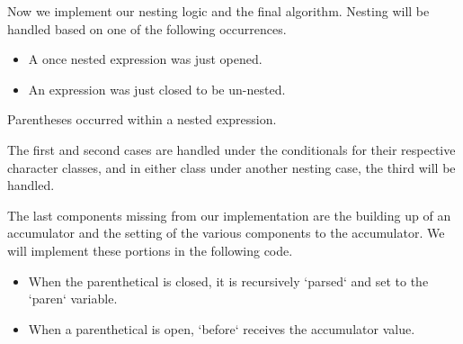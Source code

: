 \documentclass[11pt]{article}
\begin{document}
Now we implement our nesting logic and the final algorithm. Nesting will be handled based on one of the following occurrences.

\begin{itemize}
  \item A once nested expression was just opened.
  \item An expression was just closed to be un-nested.
\end{itemize}
 Parentheses occurred within a nested expression.

The first and second cases are handled under the conditionals for their respective character classes, and in either class under another nesting case, the third will be handled.

The last components missing from our implementation are the building up of an accumulator and the setting of the various components to the accumulator. We will implement these portions in the following code.

\begin{itemize}
  \item When the parenthetical is closed, it is recursively `parsed` and set to the `paren` variable.
  \item When a parenthetical is open, `before` receives the accumulator value.
\end{itemize}
\end{document}
